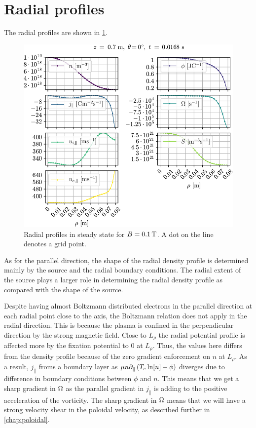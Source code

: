 \section{Radial profiles}
%
The radial profiles are shown in \cref{fig:radProfs}.
%
\begin{figure}[htb]
    \centering
    \includegraphics{fig/results/1DProfiles/B010Rad}
    \caption{Radial profiles in steady state for $B=0.1\, \text{T}$.
        A dot on the line denotes a grid point.
    }
    \label{fig:radProfs}
\end{figure}
%
As for the parallel direction, the shape of the radial density profile is determined mainly by the source and the radial boundary conditions.
The radial extent of the source plays a larger role in determining the radial density profile as compared with the shape of the source.

Despite having almost Boltzmann distributed electrons in the parallel direction at each radial point close to the axis, the Boltzmann relation does not apply in the radial direction.
This is because the plasma is confined in the perpendicular direction by the strong magnetic field.
Close to $L_\rho$ the radial potential profile is affected more by the fixation potential to $0$ at $L_\rho$.
Thus, the values here differs from the density profile because of the zero gradient enforcement on $n$ at $L_\rho$.
As a result, $j_\|$ froms a boundary layer as $\mu n \partial_\|\left(T_e\ln[n]-\phi\right)$ diverges due to difference in boundary conditions between $\phi$ and $n$.
This means that we get a sharp gradient in $\Omega$ as the parallel gradient in $j_\|$ is adding to the positive acceleration of the vorticity.
The sharp gradient in $\Omega$ means that we will have a strong velocity shear in the poloidal velocity, as described further in \cref{chap:poloidal}.
